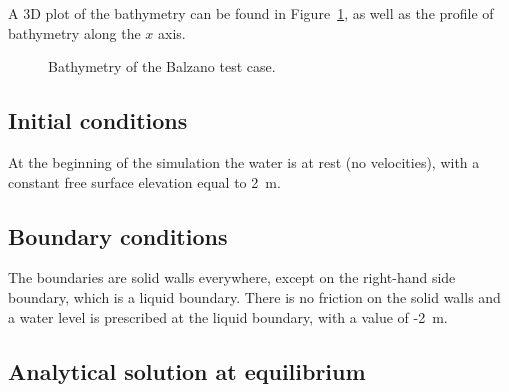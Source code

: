A 3D plot of the bathymetry can be found in Figure~\ref{fig:balzano:bathy},
as well as the profile of bathymetry along the $x$ axis.

\begin{figure}[h!]
\begin{minipage}[t]{0.45\textwidth}
 \centering
\end{minipage}%
\begin{minipage}[t]{0.55\textwidth}
 \centering
\end{minipage}
\caption{Bathymetry of the Balzano test case.}\label{fig:balzano:bathy}
\end{figure}

%

\subsection{Initial conditions}

At the beginning of the simulation the water is at rest (no velocities),
with a constant free surface elevation equal to 2~m.

\subsection{Boundary conditions}

The boundaries are solid walls everywhere, except on the right-hand side
boundary, which is a liquid boundary.
There is no friction on the solid walls and a water level is prescribed at the
liquid boundary, with a value of -2~m.

\subsection{Analytical solution at equilibrium}

